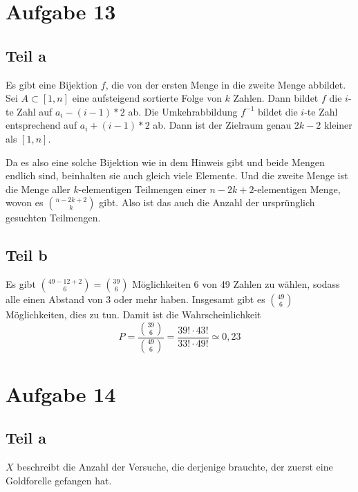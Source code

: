 \documentclass[10pt,a4paper]{article}
\begin{document}
\section{Aufgabe 13}

\subsection{Teil a}
Es gibt eine Bijektion $f$, die von der ersten Menge in die zweite Menge abbildet.
Sei $A \subset [1, n]$ eine aufsteigend sortierte Folge von $k$ Zahlen.
Dann bildet $f$ die $i$-te Zahl auf $a_{i} - (i - 1) * 2$ ab.
Die Umkehrabbildung $f^{-1}$ bildet die $i$-te Zahl entsprechend auf $a_{i} + (i - 1) * 2$ ab.
Dann ist der Zielraum genau $2k - 2$ kleiner als $[1, n]$.

Da es also eine solche Bijektion wie in dem Hinweis gibt und beide Mengen endlich sind, beinhalten sie auch gleich viele Elemente.
Und die zweite Menge ist die Menge aller $k$-elementigen Teilmengen einer $n - 2k + 2$-elementigen Menge, wovon es $\binom{n - 2k + 2}{k}$ gibt.
Also ist das auch die Anzahl der ursprünglich gesuchten Teilmengen.

\subsection{Teil b}
Es gibt $\binom{49 - 12 + 2}{6} = \binom{39}{6}$ Möglichkeiten 6 von 49 Zahlen zu wählen, sodass alle einen Abstand von $3$ oder mehr haben.
Insgesamt gibt es $\binom{49}{6}$ Möglichkeiten, dies zu tun.
Damit ist die Wahrscheinlichkeit
\begin{equation}
  P = \frac{\binom{39}{6}}{\binom{49}{6}} = \frac{39! \cdot 43!}{33! \cdot 49!} \simeq 0,23
\end{equation}

\section{Aufgabe 14}

\subsection{Teil a}
$X$ beschreibt die Anzahl der Versuche, die derjenige brauchte, der zuerst eine Goldforelle gefangen hat.
\end{document}
